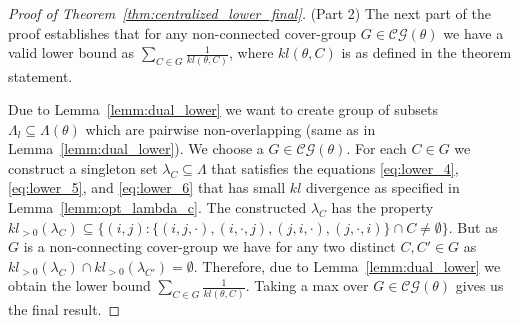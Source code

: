 \documentclass{article}
\begin{document}
\begin{proof}[Proof of Theorem~\ref{thm:centralized_lower_final}]
(Part 2) The next part of the proof establishes that for any non-connected cover-group $G \in \mathcal{CG}(\theta)$ we have a valid lower bound as $\sum_{C \in G} \frac{1}{kl(\theta, C)}$, where $kl(\theta, C)$ is as defined in the theorem statement. 

Due to Lemma~\ref{lemm:dual_lower} we want to create group of subsets $\Lambda_l \subseteq \Lambda(\theta)$ which are pairwise non-overlapping  (same as in Lemma~\ref{lemm:dual_lower}).
We choose a $G \in \mathcal{CG}(\theta)$. For each $C \in G$ we  construct a singleton set  $\lambda_C \subseteq \Lambda$ that satisfies the equations \eqref{eq:lower_4}, \eqref{eq:lower_5},  and \eqref{eq:lower_6} that has small $kl$ divergence as specified in Lemma~\ref{lemm:opt_lambda_c}. The constructed  $\lambda_C$ has the property $kl_{>0}(\lambda_C) \subseteq \{(i,j): \{(i,j, \cdot), (i, \cdot, j), (j, i, \cdot), (j, \cdot, i)\} \cap C \neq \emptyset\}$. But as $G$ is a non-connecting cover-group we have for any two distinct $C, C'\in G$ as $kl_{>0}(\lambda_C) \cap kl_{>0}(\lambda_{C'}) = \emptyset$. Therefore, due to Lemma~\ref{lemm:dual_lower} we obtain the lower bound $\sum_{C\in G} \frac{1}{kl(\theta, C)}$. Taking a max over $G \in \mathcal{CG}(\theta)$ gives us the final result.
\end{proof}
\end{document}
